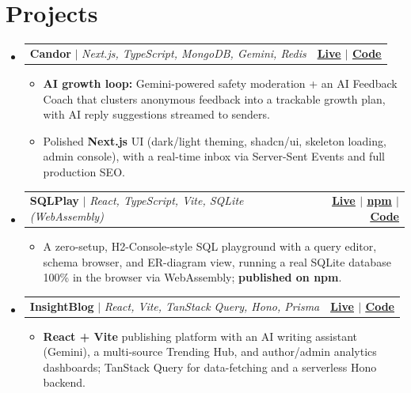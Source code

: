 \documentclass[letterpaper,11pt]{article}
\makeatletter
\newcommand{\resumeItem}[1]{
  \item\small{
    {#1 \vspace{-2pt}}
  }
}
\newcommand{\resumeProjectHeading}[2]{
    \item
    \begin{tabular*}{1.001\textwidth}{l@{\extracolsep{\fill}}r}
      \small#1 & \textbf{\small #2}\\
    \end{tabular*}\vspace{-7pt}
}
\newcommand{\resumeSubHeadingListStart}{\begin{itemize}[leftmargin=0.0in, label={}]}
\newcommand{\resumeSubHeadingListEnd}{\end{itemize}}
\newcommand{\resumeItemListStart}{\begin{itemize}}
\newcommand{\resumeItemListEnd}{\end{itemize}\vspace{-5pt}}
\makeatother
\begin{document}
\section{Projects}
    \vspace{-5pt}
    \resumeSubHeadingListStart
      \resumeProjectHeading
          {\textbf{Candor} $|$ \emph{Next.js, TypeScript, MongoDB, Gemini, Redis}}{\href{https://candor-cyan.vercel.app}{\underline{Live}} $|$ \href{https://github.com/Yogesh0627/anonymous-message-app}{\underline{Code}}}
          \resumeItemListStart
            \resumeItem{\textbf{AI growth loop:} Gemini-powered safety moderation + an AI Feedback Coach that clusters anonymous feedback into a trackable growth plan, with AI reply suggestions streamed to senders.}
            \resumeItem{Polished \textbf{Next.js} UI (dark/light theming, shadcn/ui, skeleton loading, admin console), with a real-time inbox via Server-Sent Events and full production SEO.}
          \resumeItemListEnd
          \vspace{-13pt}
      \resumeProjectHeading
          {\textbf{SQLPlay} $|$ \emph{React, TypeScript, Vite, SQLite (WebAssembly)}}{\href{https://sqlplay.vercel.app}{\underline{Live}} $|$ \href{https://www.npmjs.com/package/sqlplay}{\underline{npm}} $|$ \href{https://github.com/Yogesh0627/sqlplay}{\underline{Code}}}
          \resumeItemListStart
            \resumeItem{A zero-setup, H2-Console-style SQL playground with a query editor, schema browser, and ER-diagram view, running a real SQLite database 100\% in the browser via WebAssembly; \textbf{published on npm}.}
          \resumeItemListEnd
          \vspace{-13pt}
      \resumeProjectHeading
          {\textbf{InsightBlog} $|$ \emph{React, Vite, TanStack Query, Hono, Prisma}}{\href{https://insightblog-one.vercel.app}{\underline{Live}} $|$ \href{https://github.com/Yogesh0627/Full_Stack_Project}{\underline{Code}}}
          \resumeItemListStart
            \resumeItem{\textbf{React + Vite} publishing platform with an AI writing assistant (Gemini), a multi-source Trending Hub, and author/admin analytics dashboards; TanStack Query for data-fetching and a serverless Hono backend.}
          \resumeItemListEnd
    \resumeSubHeadingListEnd
\vspace{-9pt}

\end{document}
